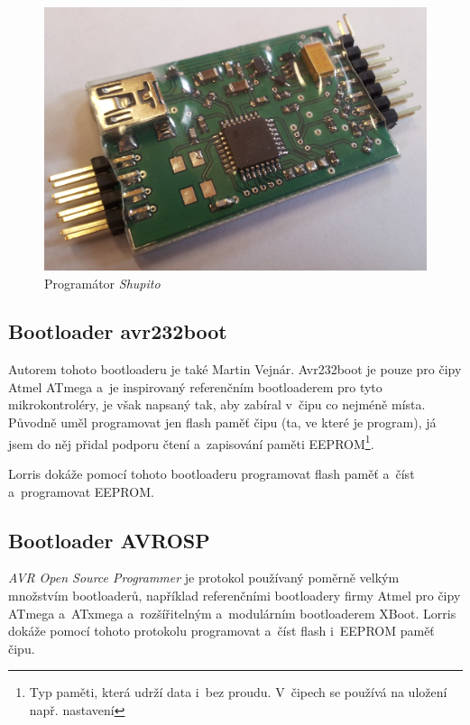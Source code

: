 \documentclass[12pt, a4paper, oneside]{article}
\newcommand{\It}{\textit}  %
\begin{document}
\begin{figure}[H]
\begin{center}
\includegraphics[width=\textwidth]{img/shupito_promo.jpg}
\caption{Programátor \It{Shupito}}
\end{center}
\end{figure}

\subsection{Bootloader avr232boot}
Autorem tohoto bootloaderu je také Martin Vejnár. Avr232boot je pouze pro čipy Atmel ATmega a~je inspirovaný referenčním bootloaderem pro tyto mikrokontroléry, je však napsaný tak, aby zabíral v~čipu co nejméně místa. Původně uměl programovat jen flash paměť čipu (ta, ve které je program), já jsem do něj přidal podporu čtení a~zapisování paměti EEPROM\footnote{Typ paměti, která udrží data i~bez proudu. V~čipech se používá na uložení např. nastavení}.

Lorris dokáže pomocí tohoto bootloaderu programovat flash paměť a~číst a~programovat EEPROM.

\subsection{Bootloader AVROSP}
\It{AVR Open Source Programmer} je protokol používaný poměrně velkým množstvím bootloaderů, například referenčními bootloadery firmy Atmel pro čipy ATmega a~ATxmega a~rozšířitelným a~modulárním bootloaderem XBoot\cite{xboot}. Lorris dokáže pomocí tohoto protokolu programovat a~číst flash i~EEPROM paměť čipu.


\newpage
\end{document}
